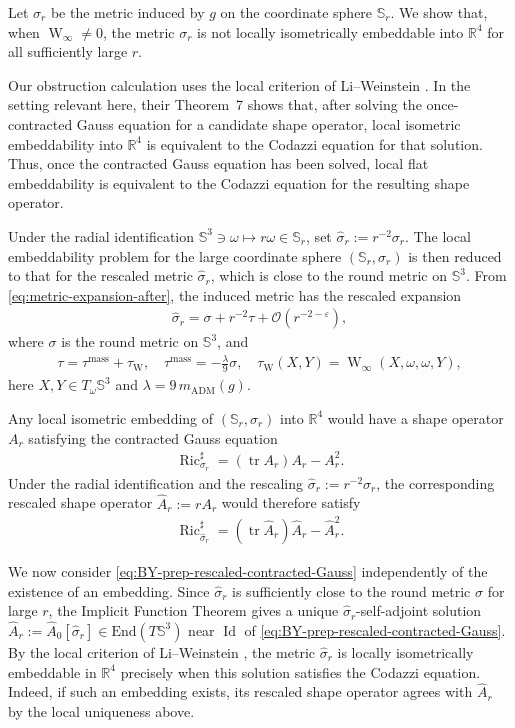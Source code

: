 \documentclass[10pt]{amsart}
\newcommand{\R}{\mathbb{R}}
\newcommand{\Sph}{\mathbb{S}}
\newcommand{\tr}{\operatorname{tr}}
\newcommand{\Ric}{\operatorname{Ric}}
\newcommand{\Weyl}{\operatorname{W}}
\newcommand{\Id}{\operatorname{Id}}
\newcommand{\End}{\mathrm{End}}
\newcommand{\ADM}{\mathrm{ADM}}
\newcommand{\mass}{\mathrm{mass}}
\theoremstyle{plain}
\theoremstyle{remark}
\begin{document}
	Let $\sigma_r$ be the metric induced by $g$ on the coordinate sphere
	$\Sph_r$.  We show that, when $\Weyl_\infty\neq0$, the metric $\sigma_r$ is not
	locally isometrically embeddable into $\R^4$ for all sufficiently large $r$.
	
	Our obstruction calculation uses the local criterion of Li--Weinstein
	\cite{LiWeinstein}.  In the setting relevant here, their Theorem~7 shows
	that, after solving the once-contracted Gauss equation for a candidate shape
	operator, local isometric embeddability into $\R^4$ is equivalent to the
	Codazzi equation for that solution. Thus, once the contracted Gauss equation has been solved, local flat
	embeddability is equivalent to the Codazzi equation for the resulting shape
	operator.
	
	Under the radial identification
	$\Sph^3\ni\omega\mapsto r\omega\in\Sph_r$, set
	$\hat\sigma_r:=r^{-2}\sigma_r$.  The local embeddability problem for the
	large coordinate sphere $(\Sph_r,\sigma_r)$ is then reduced to that for the
	rescaled metric $\hat\sigma_r$, which is close to the round metric on
	$\Sph^3$. From \eqref{eq:metric-expansion-after}, the induced metric has the rescaled expansion
	\begin{align}
		\hat\sigma_r
		=
		\sigma+r^{-2}\tau+\mathcal O(r^{-2-\varepsilon}),
	\end{align}
	where $\sigma$ is the round metric on $\Sph^3$, and
	\begin{align}
		\tau
		=
		\tau^{\mass}+\tau_{\Weyl},
		\quad
		\tau^{\mass}
		=
		-\frac{\lambda}{9}\sigma,
		\quad
		\tau_{\Weyl}(X,Y)
		=
		\Weyl_\infty(X,\omega,\omega,Y),
	\end{align}
	here $X,Y\in T_\omega\Sph^3$ and
	$\lambda=9\,m_{\ADM}(g)$.
	
	Any local isometric embedding of $(\Sph_r,\sigma_r)$ into $\R^4$ would
	have a shape operator $A_r$ satisfying the contracted Gauss equation
	\begin{align*}
		\Ric_{\sigma_r}^{\sharp}
		=
		(\tr A_r)A_r-A_r^2.
	\end{align*}
	Under the radial identification and the rescaling
	$\hat\sigma_r:=r^{-2}\sigma_r$, the corresponding rescaled shape operator
	$\hat A_r:=rA_r$ would therefore satisfy
	\begin{align}\label{eq:BY-prep-rescaled-contracted-Gauss}
		\Ric_{\hat\sigma_r}^{\sharp}
		=
		(\tr \hat A_r)\hat A_r-\hat A_r^2.
	\end{align}
	
	We now consider \eqref{eq:BY-prep-rescaled-contracted-Gauss} independently
	of the existence of an embedding.  Since $\hat\sigma_r$ is sufficiently close
	to the round metric $\sigma$ for large $r$, the Implicit Function Theorem
	gives a unique $\hat\sigma_r$-self-adjoint solution $\hat A_r:=\hat A_0[\hat\sigma_r]\in\End(T\Sph^3)$ near $\Id$ of \eqref{eq:BY-prep-rescaled-contracted-Gauss}.  By the local
	criterion of Li--Weinstein \cite{LiWeinstein}, the metric $\hat\sigma_r$ is
	locally isometrically embeddable in $\R^4$ precisely when this solution
	satisfies the Codazzi equation.  Indeed, if such an embedding exists, its
	rescaled shape operator agrees with $\hat A_r$ by the local uniqueness above.
	
\end{document}
